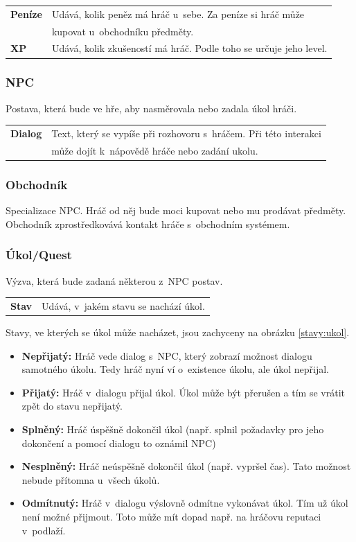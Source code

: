\documentclass[12pt,a4paper]{article}
\begin{document}
\begin{tabular*}{0.87\textwidth}{ll}
  \bf Peníze & Udává, kolik peněz má hráč u~sebe. Za peníze si hráč může\\
             & kupovat u~obchodníku předměty. \\[7pt]
  \bf XP & Udává, kolik zkušeností má hráč. Podle toho se určuje jeho level.\\[7pt]
\end{tabular*}

\subsubsection{NPC}
Postava, která bude ve hře, aby nasměrovala nebo zadala úkol hráči. \\[5pt]

\begin{tabular*}{0.87\textwidth}{ll}
  \bf Dialog & Text, který se vypíše při rozhovoru s~hráčem. Při této interakci \\
             & může dojít k~nápovědě hráče nebo zadání ukolu. \\[7pt]
\end{tabular*}

\subsubsection{Obchodník}
Specializace NPC. Hráč od něj bude moci kupovat nebo mu prodávat předměty.
Obchodník zprostředkovává kontakt hráče s~obchodním systémem.

\subsubsection{Úkol/Quest}
Výzva, která bude zadaná některou z~NPC postav.\\[5pt]

\begin{tabular*}{0.55\textwidth}{ll}
  \bf Stav & Udává, v~jakém stavu se nachází úkol.\\[7pt]
\end{tabular*}

\bigskip
\noindent
Stavy, ve kterých se úkol může nacházet, jsou zachyceny na obrázku
\ref{stavy:ukol}.

\begin {itemize}
\item{\textbf{Nepřijatý:} Hráč vede dialog s~NPC, který zobrazí možnost dialogu
  samotného úkolu. Tedy hráč nyní ví o~existence úkolu, ale úkol nepřijal.}
\item{\textbf{Přijatý:} Hráč v~dialogu přijal úkol. Úkol může být přerušen a tím
  se vrátit zpět do stavu nepřijatý.}
\item{\textbf{Splněný:} Hráč úspěšně dokončil úkol (např. splnil požadavky pro
  jeho dokončení a pomocí dialogu to oznámil NPC)}
\item{\textbf{Nesplněný:} Hráč neúspěšně dokončil úkol (např. vypršel čas). Tato
  možnost nebude přítomna u~všech úkolů.}
\item{\textbf{Odmítnutý:} Hráč v~dialogu výslovně odmítne vykonávat úkol. Tím už
  úkol není možné přijmout. Toto může mít dopad např. na hráčovu reputaci
v~podlaží.}
\end {itemize}
\end{document}
